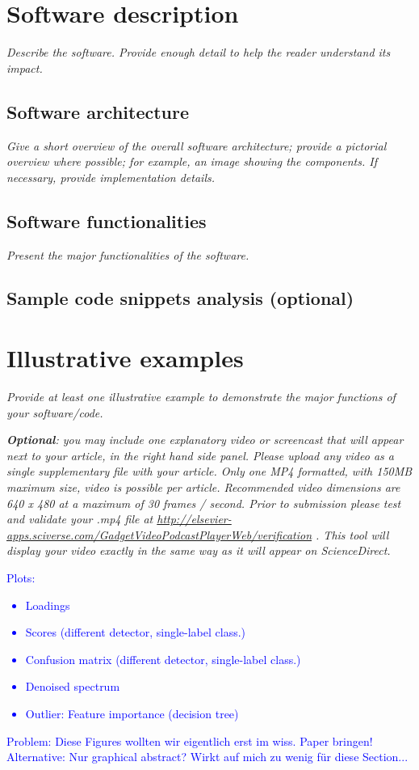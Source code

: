 \documentclass[preprint,12pt, a4paper]{elsarticle}
\begin{document}
\section{Software description}

\textit{Describe the software. Provide enough detail to help the reader understand its impact. }

\subsection{Software architecture}
\textit{  Give a short overview of the overall software architecture; provide a pictorial overview where possible; for example, an image showing the components. If necessary, provide implementation details.}

 \subsection{Software functionalities}
\textit{  Present the major functionalities of the software.}
  
 \subsection{Sample code snippets analysis (optional)}


\section{Illustrative examples}

\textit{Provide at least one illustrative example to demonstrate the major
functions of your software/code.}

\textit{\textbf{Optional}: you may include one explanatory  video or screencast that will appear next to your article, in the right hand side panel. Please upload any video as a single supplementary file with your article. Only one MP4 formatted, with 150MB maximum size, video is possible per article. Recommended video dimensions are 640 x 480 at a maximum of 30 frames / second. Prior to submission please test and validate your .mp4 file at  \url{http://elsevier-apps.sciverse.com/GadgetVideoPodcastPlayerWeb/verification} . This tool will display your video exactly in the same way as it will appear on ScienceDirect. }

\textcolor{blue}{
Plots: 
\begin{itemize}
	\item Loadings
	\item Scores (different detector, single-label class.)
	\item Confusion matrix (different detector, single-label class.)
	\item Denoised spectrum
	\item Outlier: Feature importance (decision tree)
\end{itemize}
Problem: Diese Figures wollten wir eigentlich erst im wiss. Paper bringen! 
Alternative: Nur graphical abstract? Wirkt auf mich zu wenig für diese Section...
}
\end{document}
